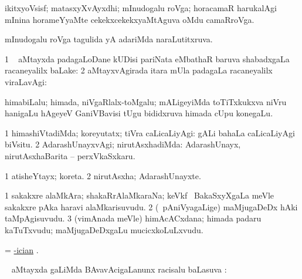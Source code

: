 \bentry
{}
\gl{\nA}
\bmng
ikitxyoVsisf; matasxyXvAyxdhi; mInudogalu roVga; horacamaR harukalAgi mInina horameYyaMte cekekxcekekxyaMtAguva oMdu camaRroVga. 
\emng
\eentry

\bentry
{}
\gl{\gu}
\bmng
mInudogalu roVga tagulida yA adariMda naraLutitxruva. 
\emng
\eentry

\bentry
{}
\gl{\saMkiSx}
\bmng
{} 
\emng
\eentry

\bentry
{}
\gl{\uparx}
\bmng
\bnum
\num{1} \sA\  aMtayxda padagaLoDane kUDisi pariNata eMbathaR baruva shabadxgaLa racaneyalilx baLake:  
\num{2}  aMtayxvAgirada itara mUla padagaLa racaneyalilx viraLavAgi:  
\enum
\emng
\eentry

\bentry
{}
\gl{\nA}
\bmng
himabiLalu; himada, niVgaRlalx-toMgalu; mALigeyiMda toTiTxkukxva niVru hanigaLu hAgeyeV GaniVBavisi tUgu bididxruva himada cUpu konegaLu. 
\emng
\eentry

\bentry
{}
\gl{\kirxvi}
\bmng
\bnum
\num{1} himashiVtadiMda; koreyutatx; tiVra caLicaLiyAgi:  gALi bahaLa caLicaLiyAgi biVsitu. 
\num{2} AdarashUnayxvAgi; nirutAsxhadiMda:  AdarashUnayx, nirutAsxhaBarita -- perxVkaSxkaru. 
\enum
\emng
\eentry

\bentry
{}
\gl{\nA}
\bmng
\bnum
\num{1} atisheYtayx; koreta. 
\num{2} nirutAsxha; AdarashUnayxte. 
\enum
\emng
\eentry

\bentry
{}
\gl{\nA}
\bmng
\bnum
\num{1} sakakxre alaMkAra; shakaRrAlaMkaraNa; keVkf \mo\ BakaSxyXgaLa meVle sakakxre pAka haravi alaMkarisuvudu. 
\num{2} (\kanmu\ pAniVyagaLige) maMjugaDeDx hAki taMpAgisuvudu. 
\num{3} (vimAnada meVle) himAcACxdana; himada padaru kaTuTxvudu; maMjugaDeDxgaLu mucicxkoLuLxvudu. 
\enum
\emng
\eentry

\bentry
{}
\gl{\uparx}
\bmng
= \hyperlink{hyp-ician}{-ician} . 
\emng
\eentry

\bentry
{}
\gl{\uparx}
\bmng
\kanmu\  aMtayxda \gu gaLiMda BAvavAcigaLanunx racisalu baLasuva \uparx:  
\emng
\eentry

